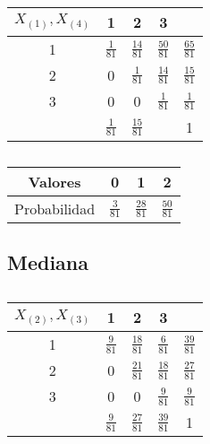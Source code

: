 \documentclass{article}
\begin{document}
    \begin{table}[H]
      \centering
      \begin{tabular}{c | c  c  c | c}
        $X_{(1)},X_{(4)}$ & 1               & 2               & 3               &                 \\ \hline
        1                 & $\frac{1}{81}$  & $\frac{14}{81}$ & $\frac{50}{81}$ & $\frac{65}{81}$ \\
        2                 & 0               & $\frac{1}{81}$  & $\frac{14}{81}$ & $\frac{15}{81}$ \\
        3                 & 0               & 0               & $\frac{1}{81}$  & $\frac{1}{81}$  \\ \hline
                          &  $\frac{1}{81}$ & $\frac{15}{81}$ &                 & 1
      \end{tabular}
      \caption{}
      \label{}
    \end{table}

    \begin{table}[H]
      \centering
      \begin{tabular}{ c | c c c |}
        Valores       & 0             & 1             & 2 \\ \hline
        Probabilidad  & $\frac{3}{81}$  & $\frac{28}{81}$ & $\frac{50}{81}$
      \end{tabular}
      \caption{}
      \label{}

    \end{table}

    \subsection{Mediana}


    \begin{table}[H]
      \centering
      \begin{tabular}{c | c  c  c | c}
        $X_{(2)},X_{(3)}$ & 1               & 2               & 3               &                 \\ \hline
        1                 & $\frac{9}{81}$  & $\frac{18}{81}$ & $\frac{6}{81}$  &$\frac{39}{81}$  \\
        2                 & 0               & $\frac{21}{81}$ & $\frac{18}{81}$ & $\frac{27}{81}$ \\
        3                 & 0               & 0               & $\frac{9}{81}$  & $\frac{9}{81}$  \\ \hline
                          & $\frac{9}{81}$  & $\frac{27}{81}$ & $\frac{39}{81}$ & 1
      \end{tabular}
      \caption{}
      \label{}
    \end{table}
\end{document}
